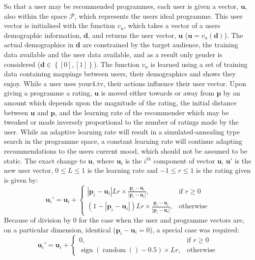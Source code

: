 	So that a user may be recommended programmes, each user is given a vector, $\mathbf{u}$, also within the space $\mathcal{P}$, which represents the users ideal programme. This user vector is initialised with the function $v_u$, which takes a vector of a users demographic information, $\mathbf{d}$, and returns the user vector, $\mathbf{u}$ ($\mathbf{u} = v_u(\mathbf{d})$). The actual demographics in $\mathbf{d}$ are constrained by the target audience, the training data available and the user data available, and as a result only gender is considered ($\mathbf{d} \in \left\{{ \left[ 0\right] ,\left[ 1\right] }\right\} $). The function $v_u$ is learned using a set of training data containing mappings between users, their demographics and shows they enjoy. While a user uses your4.tv, their actions influence their user vector. Upon giving a programme a rating, $\mathbf{u}$ is moved either towards or away from $\mathbf{p}$ by an amount which depends upon the magnitude of the rating, the initial distance between $\mathbf{u}$ and $\mathbf{p}$, and the learning rate of the recommender which may be tweaked or made inversely proportional to the number of ratings made by the user. While an adaptive learning rate will result in a simulated-annealing type search in the programme space, a constant learning rate will continue adapting recommendations to the users current mood, which should not be assumed to be static. The exact change to $\mathbf{u}$, where $\mathbf{u}_{i}$ is the $i^{th}$ component of vector $\mathbf{u}$, $\mathbf{u}'$ is the new user vector, $0 \leq L \leq 1$ is the learning rate and $-1 \leq r \leq 1$ is the rating given is given by:
	$$
		\mathbf{u}_{i}' =
		\mathbf{u}_{i} + \begin{cases}
			\left|\mathbf{p}_{i}-\mathbf{u}_{i}\right|Lr \times \frac{\mathbf{p}_{i}-\mathbf{u}_{i}}{\left|\mathbf{p}_{i}-\mathbf{u}_{i}\right|},&
				\text{if } r\geq 0\\
			(1-\left|\mathbf{p}_{i}-\mathbf{u}_{i}\right|)Lr \times \frac{\mathbf{p}_{i}-\mathbf{u}_{i}}{\left|\mathbf{p}_{i}-\mathbf{u}_{i}\right|},&
				\text{otherwise}
		\end{cases}
	$$
	Because of division by 0 for the case when the user and programme vectors are, on a particular dimension, identical ($\mathbf{p}_{i}-\mathbf{u}_{i}=0$), a special case was required:
	$$
		\mathbf{u}_{i}' =
		\mathbf{u}_{i} + \begin{cases}
			0,&
				\text{if } r\geq 0\\
			\operatorname{sign}(\operatorname{random}()-0.5)\times Lr,&
				\text{otherwise}
		\end{cases}
	$$

